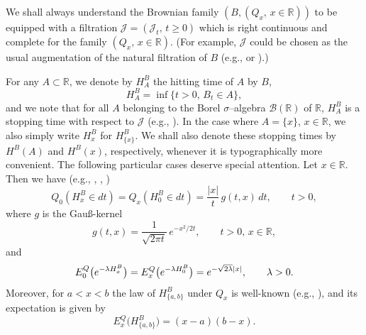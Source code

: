 \documentclass[11pt,a4paper]{amsart}
\newcommand{\gl}{\lambda}
\newcommand{\gs}{\sigma}
\newcommand{\cB}{\mathcal{B}}
\newcommand{\cJ}{\mathcal{J}}
\newcommand{\1}{1}
\newcommand{\R}{\mathbb{R}}
\theoremstyle{remark}
\newcommand{\sgl}{\ensuremath\sqrt{2\gl}}
\numberwithin{equation}{section}
\begin{document}
We shall always understand the Brownian family $(B, (Q_x,\,x\in\R))$ to be equipped
with a filtration $\cJ=(\cJ_t,\,t\ge 0)$ which is right continuous and complete for
the family $(Q_x,\,x\in\R)$. (For example, $\cJ$ could be chosen as the usual
augmentation of the natural filtration of $B$ (e.g., \cite[Sect.~2.7]{KaSh91} or
\cite[Sect.'s~I.4, III.2]{ReYo91}).)

For any $A\subset\R$, we denote by $H^B_A$ the hitting time of $A$ by $B$,
\begin{equation}    \label{eq1.2}
    H^B_A = \inf\{t>0,\,B_t\in A\},
\end{equation}
and we note that for all $A$ belonging to the Borel $\gs$--algebra $\cB(\R)$ of
$\R$, $H^B_A$ is a stopping time with respect to $\cJ$ (e.g.,
\cite[Theorem~III.2.17]{ReYo91}). In the case where $A=\{x\}$, $x\in\R$, we also
simply write $H^B_x$ for $H^B_{\{x\}}$. We shall also denote these stopping times by
$H^B(A)$ and $H^B(x)$, respectively, whenever it is typographically more convenient.
The following particular cases deserve special attention. Let $x\in\R$. Then we have
(e.g., \cite[Sect.~1.7]{ItMc74}, \cite[Sect.~2.6]{KaSh91}, \cite[Sect.'s~II.3,
III.3]{ReYo91})
\begin{equation}    \label{eq1.3}
    Q_0(H^B_x\in dt) = Q_x(H^B_0\in dt) = \frac{|x|}{t}\,g(t,x)\,dt,\qquad t>0,
\end{equation}
where $g$ is the Gau{\ss}-kernel
\begin{equation}    \label{eq1.4}
    g(t,x) = \frac{1}{\sqrt{2\pi t}}\,e^{-x^2/2t},\qquad t>0,\,x\in\R,
\end{equation}
and
\begin{equation}    \label{eq1.5}
    E^Q_0\bigl(e^{-\gl H^B_x}\bigr)
             = E^Q_x\bigl(e^{-\gl H^B_0}\bigr) = e^{-\sgl |x|},\qquad \gl>0.
\end{equation}
Moreover, for $a<x<b$ the law of $H^B_{\{a,b\}}$ under $Q_x$ is well-known (e.g.,
\cite[Problem~6, Sect.~1.7]{ItMc74}), and its expectation is given by
\begin{equation}    \label{eq1.6}
    E^Q_x\bigl(H^B_{\{a,b\}}\bigr) = (x-a)(b-x).
\end{equation}
\end{document}
